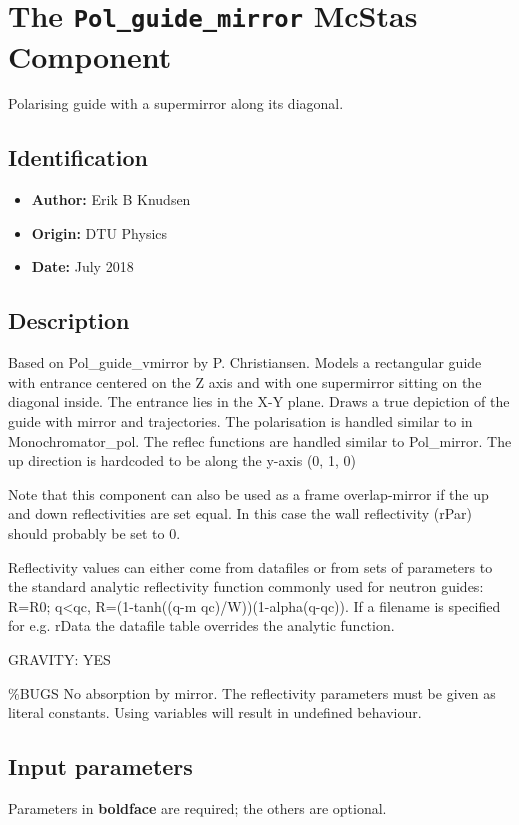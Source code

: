 \section{The \texttt{Pol\_guide\_mirror} McStas Component}
Polarising guide with a supermirror along its diagonal.

\subsection*{Identification}
\begin{itemize}
  \item \textbf{Author:} Erik B Knudsen
  \item \textbf{Origin:} DTU Physics
  \item \textbf{Date:} July 2018
\end{itemize}

\subsection*{Description}
Based on Pol\_guide\_vmirror by P. Christiansen. Models a rectangular guide with entrance centered on the Z axis and with one supermirror sitting on the diagonal inside. The entrance lies in the X-Y plane. Draws a true depiction of the guide with mirror and trajectories. The polarisation is handled similar to in Monochromator\_pol. The reflec functions are handled similar to Pol\_mirror. The up direction is hardcoded to be along the y-axis (0, 1, 0)

Note that this component can also be used as a frame overlap-mirror if the up and down reflectivities are set equal. In this case the wall reflectivity (rPar) should probably be set to 0.

Reflectivity values can either come from datafiles or from sets of parameters to the standard analytic reflectivity function commonly used for neutron guides: R=R0; q\textless{}qc, R=(1-tanh((q-m qc)/W))(1-alpha(q-qc)). If a filename is specified for e.g. rData the datafile table overrides the analytic function.

GRAVITY: YES

\%BUGS No absorption by mirror. The reflectivity parameters must be given as literal constants. Using variables will result in undefined behaviour.

\subsection*{Input parameters}
Parameters in \textbf{boldface} are required; the others are optional.

